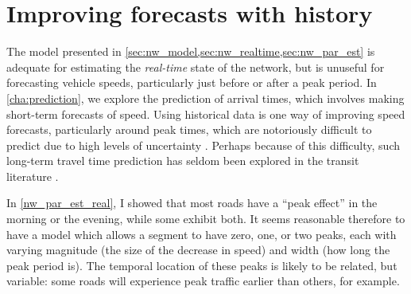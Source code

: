 \section{Improving forecasts with history}
\label{sec:nw_hist_model}

The model presented in \cref{sec:nw_model,sec:nw_realtime,sec:nw_par_est} is adequate for estimating the \emph{real-time} state of the network, but is unuseful for forecasting vehicle speeds, particularly just before or after a peak period. In \cref{cha:prediction}, we explore the prediction of arrival times, which involves making short-term forecasts of speed. Using historical data is one way of improving speed forecasts, particularly around peak times, which are notoriously difficult to predict due to high levels of uncertainty \citep{He_2020}. Perhaps because of this difficulty, such long-term travel time prediction has seldom been explored in the transit literature \citep{Moreira_2015}.


In \cref{nw_par_est_real}, I showed that most roads have a ``peak effect'' in the morning or the evening, while some exhibit both. It seems reasonable therefore to have a model which allows a segment to have zero, one, or two peaks, each with varying magnitude (the size of the decrease in speed) and width (how long the peak period is). The temporal location of these peaks is likely to be related, but variable: some roads will experience peak traffic earlier than others, for example.


